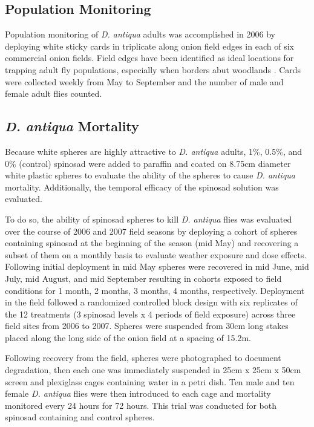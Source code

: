 \documentclass[alpha-refs]{wiley-article}
\begin{document}
\subsection{Population Monitoring}

Population monitoring of \textit{D. antiqua} adults was accomplished in 2006 by deploying white sticky cards in triplicate along onion field edges in each of six commercial onion fields.  Field edges have been identified as ideal locations for trapping adult fly populations, especially when borders abut woodlands \citep{werling2006spatial}.  Cards were collected weekly from May to September and the number of male and female adult flies counted.

\subsection{\textit{D. antiqua} Mortality}

Because white spheres are highly attractive to \textit{D. antiqua} adults, 1\%, 0.5\%, and 0\% (control) spinosad were added to paraffin and coated on 8.75cm diameter white plastic spheres to evaluate the ability of the spheres to cause \textit{D. antiqua} mortality. Additionally, the temporal efficacy of the spinosad solution was evaluated.

To do so, the ability of spinosad spheres to kill \textit{D. antiqua} flies was evaluated over the course of 2006 and 2007 field seasons by deploying a cohort of spheres containing spinosad at the beginning of the season (mid May) and recovering a subset of them on a monthly basis to evaluate weather exposure and dose effects.  Following initial deployment in mid May spheres were recovered in mid June, mid July, mid August, and mid September resulting in cohorts exposed to field conditions for 1 month, 2 months, 3 months, 4 months, respectively. Deployment in the field followed a randomized controlled block design with six replicates of the 12 treatments (3 spinosad levels x 4 periods of field exposure) across three field sites from 2006 to 2007.  Spheres were suspended from 30cm long stakes placed along the long side of the onion field at a spacing of 15.2m.  

Following recovery from the field, spheres were photographed to document degradation, then each one was immediately suspended in 25cm x 25cm x 50cm screen and plexiglass cages containing water in a petri dish. Ten male and ten female \textit{D. antiqua} flies were then introduced to each cage and mortality monitored every 24 hours for 72 hours. This trial was conducted for both spinosad containing and control spheres. 
 
\end{document}
